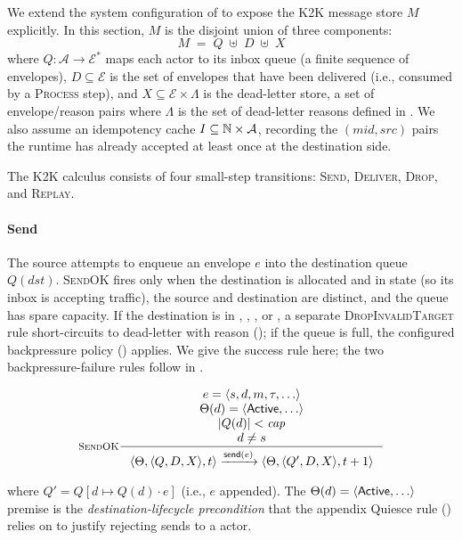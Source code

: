 We extend the system configuration of  to
expose the K2K message store \(M\) explicitly.  In this section,
\(M\) is the disjoint union of three components:
\[
  M \;=\;
  Q \;\uplus\; D \;\uplus\; X
\]
where \(Q : \mathcal{A} \to \mathcal{E}^*\) maps each actor to its
inbox queue (a finite sequence of envelopes), \(D \subseteq
\mathcal{E}\) is the set of envelopes that have been delivered (i.e.,
consumed by a \textsc{Process} step), and \(X \subseteq \mathcal{E}
\times \Lambda\) is the dead-letter store, a set of envelope/reason
pairs where \(\Lambda\) is the set of dead-letter reasons defined in
.  We also assume an idempotency cache
\(I \subseteq \mathbb{N} \times \mathcal{A}\), recording the
\((\mathit{mid}, \mathit{src})\) pairs the runtime has already
accepted at least once at the destination side.

The K2K calculus consists of four small-step transitions:
\textsc{Send}, \textsc{Deliver}, \textsc{Drop}, and \textsc{Replay}.

\paragraph{Send}
The source attempts to enqueue an envelope \(e\) into the destination
queue \(Q(\mathit{dst})\).  \textsc{SendOK} fires only when the
destination is allocated and in \Active{} state (so its inbox is
accepting traffic), the source and destination are distinct, and
the queue has spare capacity.  If the destination is in
\Draining{}, \Initializing{}, \Terminated{}, or \Failed{}, a
separate \textsc{DropInvalidTarget} rule short-circuits to
dead-letter with reason 
(); if the queue is full, the configured
backpressure policy () applies.  We
give the success rule here; the two backpressure-failure rules
follow in .

\begin{equation}
\inference[\textsc{SendOK}]
{
  e = \langle s, d, m, \tau, \ldots\rangle \\
  \Theta(d) = \langle \Active{}, \ldots\rangle \\
  |Q(d)| < \mathit{cap} \\
  d \neq s
}
{
  \langle \Theta, \langle Q, D, X\rangle, t\rangle
  \trans{\mathsf{send}(e)}
  \langle \Theta, \langle Q', D, X\rangle, t+1\rangle
}
\label{rule:k2k-send}
\end{equation}

\noindent where \(Q' = Q[d \mapsto Q(d) \cdot e]\) (i.e., \(e\)
appended).  The \(\Theta(d) = \langle \mathsf{Active}{}, \ldots\rangle\)
premise is the \emph{destination-lifecycle precondition} that the
appendix Quiesce rule () relies on to justify
rejecting sends to a \Draining{} actor.

